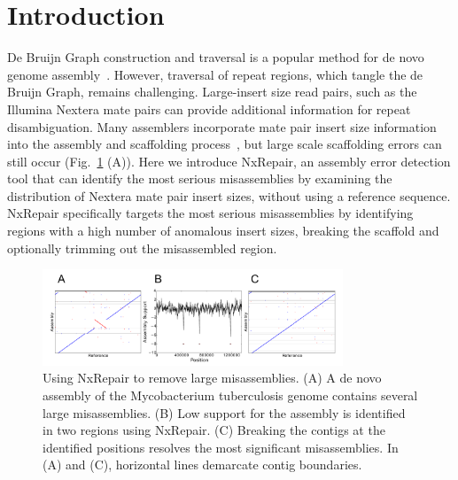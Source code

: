 \documentclass{bioinfo}
\begin{document}
\section{Introduction}
De Bruijn Graph construction and traversal is a popular method for de novo genome assembly~\citep{compeau2012}. However, traversal of repeat regions, which tangle the de Bruijn Graph, remains challenging. Large-insert size read pairs, such as the Illumina Nextera mate pairs can provide additional information for repeat disambiguation. Many assemblers incorporate mate pair insert size information into the assembly and scaffolding process~\cite{bankevich2012, zerbino2008}, but large scale scaffolding errors can still occur (Fig.~\ref{fig:NxRepair} (A)). Here we introduce NxRepair, an assembly error detection tool that can identify the most serious misassemblies by examining the distribution of Nextera mate pair insert sizes, without using a reference sequence. NxRepair specifically targets the most serious misassemblies by identifying regions with a high number of anomalous insert sizes, breaking the scaffold and optionally trimming out the misassembled region. 

\begin{figure}
\centerline{\includegraphics[width=0.8\textwidth]{fig1_nxrepair.pdf}}
\caption{Using NxRepair to remove large misassemblies. (A) A de novo assembly of the Mycobacterium tuberculosis genome contains several large misassemblies. (B) Low support for the assembly is identified in two regions using NxRepair. (C) Breaking the contigs at the identified positions resolves the most significant misassemblies. In (A) and (C), horizontal lines demarcate contig boundaries.}\label{fig:NxRepair}
\end{figure}
\end{document}
